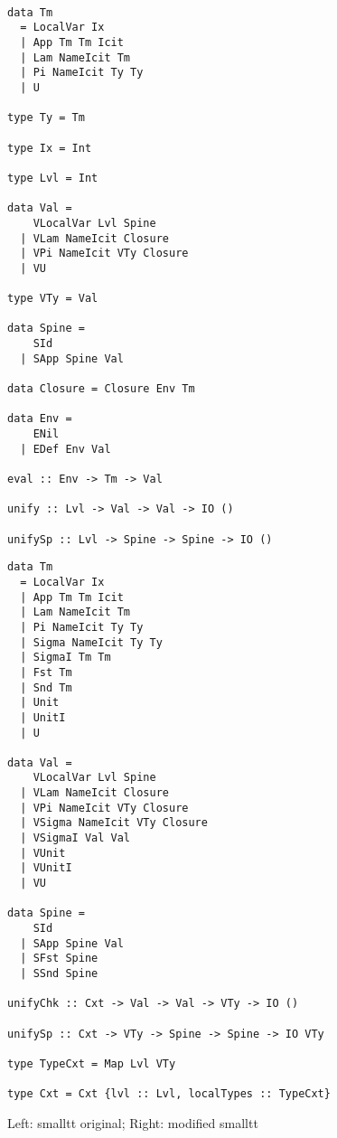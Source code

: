 \begin{figure*}
\begin{minipage}{.49\textwidth}
\small
\begin{lstlisting}

data Tm
  = LocalVar Ix
  | App Tm Tm Icit
  | Lam NameIcit Tm
  | Pi NameIcit Ty Ty
  | U

type Ty = Tm

type Ix = Int

type Lvl = Int

data Val =
    VLocalVar Lvl Spine
  | VLam NameIcit Closure
  | VPi NameIcit VTy Closure
  | VU

type VTy = Val

data Spine =
    SId
  | SApp Spine Val

data Closure = Closure Env Tm

data Env =
    ENil
  | EDef Env Val

eval :: Env -> Tm -> Val

unify :: Lvl -> Val -> Val -> IO ()

unifySp :: Lvl -> Spine -> Spine -> IO ()
\end{lstlisting}
\end{minipage}
\begin{minipage}{.49\textwidth}
\begin{lstlisting}
data Tm
  = LocalVar Ix
  | App Tm Tm Icit
  | Lam NameIcit Tm
  | Pi NameIcit Ty Ty
  | Sigma NameIcit Ty Ty
  | SigmaI Tm Tm
  | Fst Tm
  | Snd Tm
  | Unit
  | UnitI
  | U

data Val =
    VLocalVar Lvl Spine
  | VLam NameIcit Closure
  | VPi NameIcit VTy Closure
  | VSigma NameIcit VTy Closure
  | VSigmaI Val Val
  | VUnit
  | VUnitI
  | VU

data Spine =
    SId
  | SApp Spine Val
  | SFst Spine
  | SSnd Spine

unifyChk :: Cxt -> Val -> Val -> VTy -> IO ()

unifySp :: Cxt -> VTy -> Spine -> Spine -> IO VTy

type TypeCxt = Map Lvl VTy

type Cxt = Cxt {lvl :: Lvl, localTypes :: TypeCxt}
\end{lstlisting}
\end{minipage}
\caption{Left: smalltt original; Right: modified smalltt}
\end{figure*}

